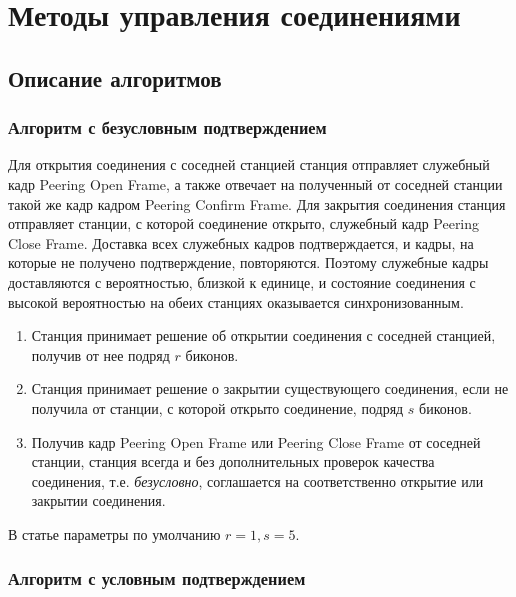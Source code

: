 

\section{Методы управления соединениями}

\subsection{Описание алгоритмов}

\subsubsection{Алгоритм с безусловным подтверждением}

 Для открытия соединения с соседней станцией станция отправляет служебный кадр Peering Open Frame, а также отвечает на полученный от соседней станции такой же кадр кадром Peering Confirm Frame. Для закрытия соединения станция отправляет станции, с которой соединение открыто, служебный кадр Peering Close Frame. Доставка всех служебных кадров подтверждается, и кадры, на которые не получено подтверждение, повторяются. Поэтому служебные кадры доставляются с вероятностью, близкой к единице, и состояние соединения с высокой вероятностью на обеих станциях оказывается синхронизованным. %

\begin{enumerate}
 \item Станция принимает решение об открытии соединения с соседней станцией, получив от нее подряд $r$ биконов.
 \item Станция принимает решение о закрытии существующего соединения, если не получила от станции, с которой открыто соединение, подряд $s$ биконов.%
 \item Получив кадр Peering Open Frame или Peering Close Frame от соседней станции, станция всегда и без дополнительных проверок качества соединения, т.е. \emph{безусловно}, соглашается на соответственно открытие или закрытии соединения.
\end{enumerate}

 В статье параметры по умолчанию $r=1, s=5$. 
 
\subsubsection{Алгоритм с условным подтверждением}

